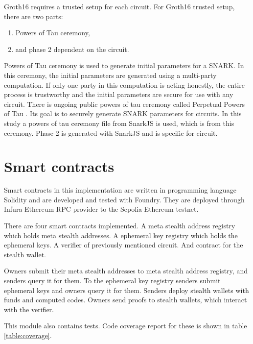 Groth16 requires a trusted setup for each circuit. For Groth16 trusted
setup, there are two parts:
\begin{enumerate}
    \item Powers of Tau ceremony\cite{PowersOfTau},
    \item and phase 2 dependent on the circuit.
\end{enumerate}
Powers of Tau ceremony is used to generate initial parameters for a SNARK.
In this ceremony, the initial parameters are generated using a multi-party
computation. If only one party in this computation is acting honestly,
the entire process is trustworthy and the initial parameters are secure
for use with any circuit. There is ongoing public powers of tau ceremony
called Perpetual Powers of Tau \cite{PerpetualPTAU}. Its goal is to
securely generate SNARK parameters for circuits. In this study a powers
of tau ceremony file from SnarkJS\cite{snarkjs} is used, which is from
this ceremony. Phase 2 is generated with SnarkJS and is specific for circuit.

\section{Smart contracts}

Smart contracts in this implementation are written in programming
language Solidity\cite{solidity} and are developed and tested
with Foundry\cite{foundry}. They are deployed through
Infura\cite{infura} Ethereum RPC provider to the Sepolia Ethereum
testnet\cite{sepolia}.

There are four smart contracts implemented. A meta stealth address
registry which holds meta stealth addresses. A ephemeral key registry
which holds the ephemeral keys. A verifier of previously mentioned
circuit. And contract for the stealth wallet.

Owners submit their meta stealth addresses to meta stealth address registry,
and senders query it for them. To the ephemeral key registry senders submit
ephemeral keys and owners query it for them. Senders deploy stealth wallets
with funds and computed codes. Owners send proofs to stealth wallets,
which interact with the verifier.

This module also contains tests. Code coverage report for these is shown in
table \ref{table:coverage}.

